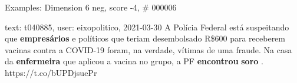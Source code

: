 \begin{frame}{Examples: Dimension 6 neg, score -4, \# 000006}
\footnotesize
\begin{alertblock}{text: t040885, user: eixopolitico, 2021-03-30}
 A Polícia Federal está suspeitando que \textbf{empresários} 
e políticos que teriam desembolsado R\$600 para receberem vacinas contra a 
COVID-19 foram, na verdade, vítimas de uma fraude. Na casa da 
\textbf{enfermeira} que aplicou a vacina no grupo, a PF \textbf{encontrou} 
\textbf{soro} . https://t.co/bUPDjsuePr 
\end{alertblock}
\end{frame}

